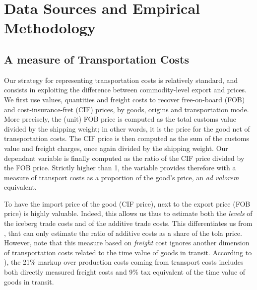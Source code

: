 \documentclass[a4paper,11pt]{article}
\begin{document}


\section{Data Sources and Empirical Methodology}

\subsection{A measure of Transportation Costs}

\noindent

Our strategy for representing transportation costs is relatively standard, and consists in exploiting the difference between commodity-level export and prices. We first use values, quantities and freight costs to recover free-on-board (FOB) and cost-insurance-fret (CIF) prices, by goods, origins and transportation mode. More precisely, the (unit) FOB price is computed as the total customs value divided by the shipping weight; in other words, it is the price for the good net of transportation costs. The CIF price is then computed as the sum of the customs value and freight charges, once again divided by the shipping weight. Our dependant variable is finally computed as the ratio of the CIF price divided by the FOB price. Strictly higher than 1, the variable provides therefore with a measure of transport costs as a proportion of the good's price, an \emph{ad valorem} equivalent.

To have the import price of the good (CIF price), next to the export price (FOB price) is highly valuable. Indeed, this allows us thus to estimate both the \textit{levels} of the iceberg trade costs and of the additive trade costs. This differentiates us from \citet{Irrazabal_2015}, that can only estimate the ratio of additive costs as a share of the tola price. However, note that this measure based on \emph{freight} cost ignores another dimension of transportation costs related to the time value of goods in transit. According to \citet{anderson_wincoop_jel}), the 21\% markup over production costs coming from transport costs includes both directly measured freight costs and 9\% tax equivalent of the time value of goods in transit.
\end{document}
